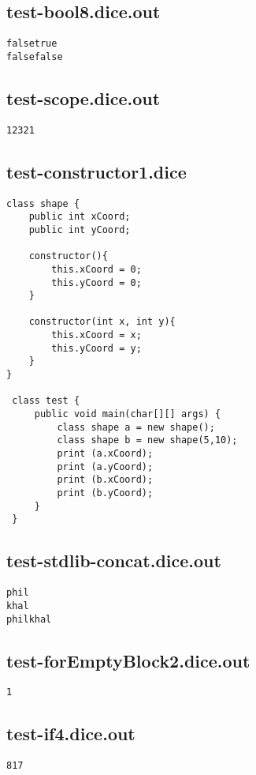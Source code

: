 \subsection{test-bool8.dice.out}
\begin{verbatim}
falsetrue
falsefalse
\end{verbatim}
\pagebreak
\subsection{test-scope.dice.out}
\begin{verbatim}
12321
\end{verbatim}
\pagebreak
\subsection{test-constructor1.dice}
\begin{verbatim}
class shape {
	public int xCoord;
	public int yCoord;
	
	constructor(){
		this.xCoord = 0;
		this.yCoord = 0;
	}

	constructor(int x, int y){
		this.xCoord = x;
		this.yCoord = y;
	}
}

 class test {
	 public void main(char[][] args) {
		 class shape a = new shape();
		 class shape b = new shape(5,10);
		 print (a.xCoord);
		 print (a.yCoord);
		 print (b.xCoord);
		 print (b.yCoord);
	 }
 }
\end{verbatim}
\pagebreak
\subsection{test-stdlib-concat.dice.out}
\begin{verbatim}
phil
khal
philkhal

\end{verbatim}
\pagebreak
\subsection{test-forEmptyBlock2.dice.out}
\begin{verbatim}
1
\end{verbatim}
\pagebreak
\subsection{test-if4.dice.out}
\begin{verbatim}
817
\end{verbatim}
\pagebreak
